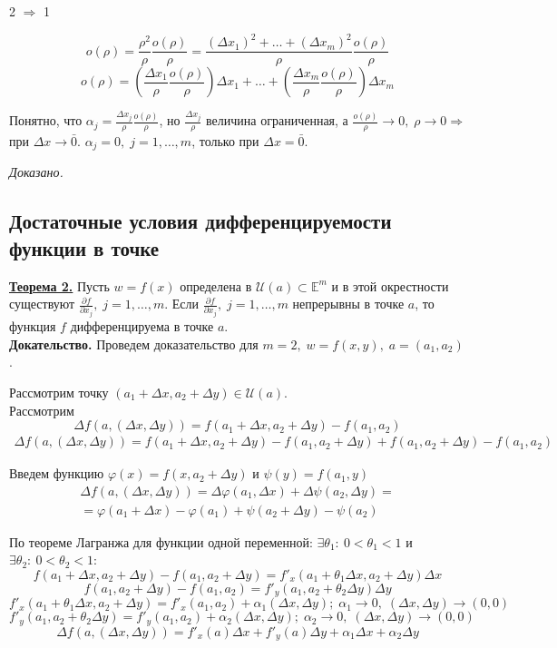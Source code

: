 \documentclass[a4paper,12pt]{article} %
\begin{document}
	2 $\Rightarrow$ 1 
	
	\[o(\rho) = \frac{\rho^2}{\rho} \frac{o(\rho)}{\rho} = \frac{(\Delta x_1)^2 + \ldots + (\Delta x_m)^2}{\rho} \frac{o(\rho)}{\rho}\]
	\[o(\rho) = (\frac{\Delta x_1}{\rho}\frac{o(\rho)}{\rho})\Delta x_1 + \ldots + (\frac{\Delta x_m}{\rho}\frac{o(\rho)}{\rho})\Delta x_m \]
	
	Понятно, что $\alpha_j = \frac{\Delta x_j}{\rho}\frac{o(\rho)}{\rho}$, но $\frac {\Delta x_j}{\rho}$ величина ограниченная, а $\frac {o(\rho)}{\rho} \to 0, \; \rho \to 0 \Rightarrow $ при $\Delta x \to \bar 0$.
	$\alpha_j = 0, \; j = 1, \ldots, m$, только при $\Delta x = \bar0$.
	
	\textit{Доказано.}
	
	
	\subsection{Достаточные условия дифференцируемости функции в точке}
	
	\underline{\textbf{Теорема 2.}} Пусть $w = f(x)$ определена в $\mathscr{U}(a) \subset \mathds{E}^m$
	и в этой окрестности существуют $\frac{\partial f}{\partial x_j}, \; j = 1, \ldots, m$. 
	Если  $\frac{\partial f}{\partial x_j}, \; j = 1, \ldots, m$ непрерывны в точке $a$, то функция $f$ дифференцируема в точке $a$.\\
	
	\textbf{Докательство.} Проведем доказательство для $m = 2, \; w = f(x, y), \; a = (a_1, a_2)$.
	
	Рассмотрим точку $(a_1 + \Delta x, a_2 + \Delta y) \in \mathscr{U}(a)$.\\
	
	Рассмотрим 
	\[\Delta f(a, (\Delta x, \Delta y)) = f(a_1 + \Delta x, a_2 + \Delta y) - f(a_1, a_2)\]
	\begin{multline*}
		\Delta f(a, (\Delta x, \Delta y)) = f(a_1 + \Delta x, a_2 + \Delta y)
		- f(a_1, a_2 + \Delta y) + f(a_1, a_2 + \Delta y) - f(a_1, a_2)
	\end{multline*}
	
	Введем функцию $\varphi(x) = f(x, a_2 + \Delta y)$ и $\psi(y) = f(a_1, y)$
	\begin{multline*}
		\Delta f(a, (\Delta x, \Delta y)) = \Delta\varphi(a_1, \Delta x) + \Delta\psi(a_2, \Delta y) = \\
		= \varphi(a_1 + \Delta x) - \varphi(a_1) + \psi(a_2 + \Delta y) - \psi(a_2)
	\end{multline*}
	
	По теореме Лагранжа для функции одной переменной: $\exists \theta_1: ~0 < \theta_1 < 1$ и $\exists \theta_2: ~ 0 < \theta_2 < 1:$
	\[f(a_1 + \Delta x, a_2 + \Delta y) - f(a_1, a_2 + \Delta y) = f'_x(a_1 + \theta_1 \Delta x, a_2 + \Delta y)\Delta x\]
	\[f(a_1, a_2 + \Delta y) - f(a_1, a_2) = f'_y(a_1, a_2 + \theta_2 \Delta y)\Delta y\]
	\[f'_x(a_1 + \theta_1\Delta x, a_2 + \Delta y) = f'_x(a_1, a_2) + \alpha_1(\Delta x, \Delta y); \; \alpha_1 \to 0, \; (\Delta x, \Delta y) \to (0, 0)\]
	\[f'_y(a_1, a_2 + \theta_2 \Delta y) = f'_y(a_1, a_2) + \alpha_2(\Delta x, \Delta y); \; \alpha_2 \to 0, \; (\Delta x, \Delta y) \to (0, 0)\]
	\[\Delta f(a, (\Delta x, \Delta y)) = f'_x(a)\Delta x +f'_y(a)\Delta y + \alpha_1\Delta x + \alpha_2 \Delta y\]
	
\end{document}
